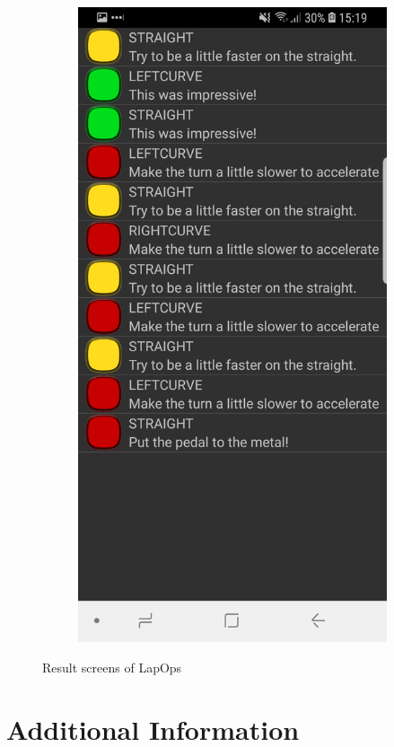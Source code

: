 \begin{figure}[H]
\begin{subfigure}[c]{0.32\textwidth}
	\end{subfigure}
	\hfill
	\begin{subfigure}[c]{0.32\textwidth}
		\includegraphics[width=\textwidth]{Pictures/App/SectionScreen2.jpg}
	\end{subfigure}

	\caption{Result screens of LapOps}
	\label{LapOpsResult}
\end{figure}

\section{Additional Information}